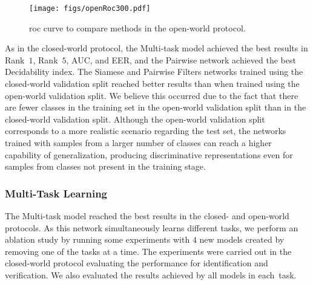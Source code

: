 \begin{figure}[!ht]
\centering

   	\texttt{[image: figs/openRoc300.pdf]}

\vspace{-3mm}
\caption{\gls*{roc} curve to compare methods in the open-world protocol.}
\label{fig:roc_open}
\end{figure}

As in the closed-world protocol, the Multi-task model achieved the best results in Rank~$1$, Rank~$5$, AUC, and EER, and the Pairwise network achieved the best Decidability index.
The Siamese and Pairwise Filters networks trained using the closed-world validation split reached better results than when trained using the open-world validation split.
We believe this occurred due to the fact that there are fewer classes in the training set in the open-world validation split than in the closed-world validation split.
Although the open-world validation split corresponds to a more realistic scenario regarding the test set, the networks trained with samples from a larger number of classes can reach a higher capability of generalization, producing discriminative representations even for samples from classes not present in the training stage.

\subsubsection{Multi-Task Learning}
\label{sec:multi}

The Multi-task model reached the best results in the closed- and open-world protocols.
As this network simultaneously learns different tasks, we perform an ablation study by running some experiments with $4$ new models created by removing one of the tasks at a time.
The experiments were carried out in the closed-world protocol evaluating the performance for identification and verification.
We also evaluated the results achieved by all models in each~task.

